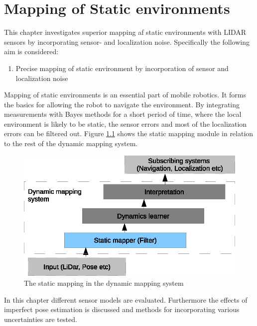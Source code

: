 \chapter{Mapping of Static environments}
This chapter investigates superior mapping af static environments with LIDAR sensors by incorporating sensor- and localization noise. 
Specifically the following aim is considered:

\begin{enumerate}
    \setcounter{enumi}{0}
    \item Precise mapping of static environment by incorporation of sensor and localization noise
\end{enumerate}

Mapping of static environments is an essential part of mobile robotics. It forms the basics for allowing the robot to navigate the environment. 
By integrating measurements with Bayes methods for a short period of time, where the local environment is likely to be static, the sensor errors and most of the localization errors can be filtered out.
Figure \ref{fig:static_map_overview} shows the static mapping module in relation to the rest of the dynamic mapping system.  

\begin{figure}[htbp]
		\centering
		\includegraphics[scale=1]{chapters/static_mapping/figures/static_map_overview.eps}
		\caption{The static mapping in the dynamic mapping system}
		\label{fig:static_map_overview}
\end{figure}

In this chapter different sensor models are evaluated. Furthermore the effects of imperfect pose estimation is discussed and methods for incorporating various uncertainties are tested. 





